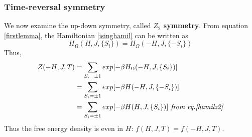 \documentclass[12pt,titlepage]{article}
\numberwithin{equation}{section}
\begin{document}
\subsubsection{Time-reversal symmetry}
We now examine the up-down symmetry, called \textbf{$Z_2$ symmetry}. From equation \ref{firstlemma}, the Hamiltonian \ref{isinghamil} can be written as 
\begin{equation}
\label{hamilz2}
    H_{\Omega}(H,J,\{S_i\})=H_{\Omega}(-H,J,\{-S_i\})
\end{equation}
Thus,
\begin{equation}
\begin{split}
\label{t-reveral-sym}
    Z(-H, J,T)&=\sum_{S_i=\pm1}exp[-\beta H_{\Omega}(-H,J,\{S_i\})]\\
    &=\sum_{S_i=\pm1}exp[-\beta H(-H,J,\{-S_i\})]\\
    &=\sum_{S_i=\pm1}exp[-\beta H(H,J,\{S_i\})]\textit{ from eq.\ref{hamilz2}}\\
\end{split}
\end{equation}
Thus the free energy density is even in $H$: $f(H,J,T)=f(-H,J,T)$.
\end{document}
